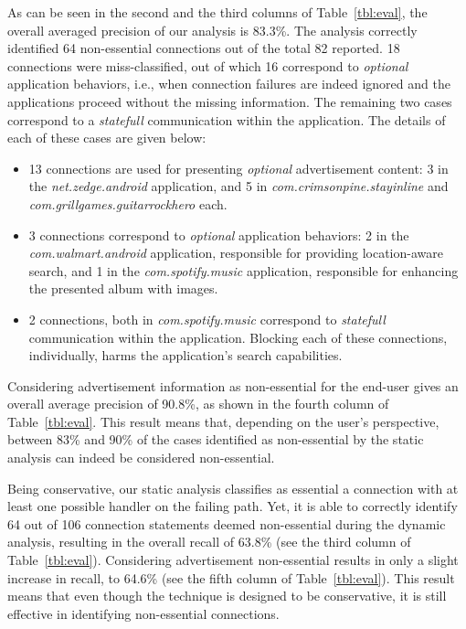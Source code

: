 As can be seen in the second and the third columns of Table~\ref{tbl:eval}, the overall averaged precision of our analysis is 83.3\%. 
The analysis correctly identified 64 non-essential connections out of the total 82 reported. 
18 connections were miss-classified, out of which 16 correspond to \emph{optional} application behaviors, i.e.,
when connection failures are indeed ignored and the applications proceed without the missing information. The 
remaining two cases correspond to a \emph{statefull} communication within the application. 
The details of each of these cases are given below: 

\begin{itemize}
\item 13 connections are used for presenting \emph{optional} advertisement content: 
3 in the \emph{net.zedge.android} application, and 
5 in \emph{com.crimsonpine.stayinline} and \emph{com.grillgames.guitarrockhero} each.
\item 3 connections correspond to 
\emph{optional} application behaviors: 2 in the \emph{com.walmart.android} application, responsible for providing location-aware search, and 1 in the \emph{com.spotify.music} application, responsible for enhancing the presented album with images.
\item 2 connections, both in \emph{com.spotify.music} correspond to \emph{statefull} communication within the application. 
Blocking each of these connections, individually, harms the application's search capabilities.
\end{itemize}

Considering advertisement information as non-essential for the end-user gives an overall average precision of 90.8\%, as shown in the fourth column of Table~\ref{tbl:eval}. This result means that, depending on the user's perspective, 
between 83\% and 90\% of the cases identified as non-essential by the static analysis can indeed be considered non-essential. 

Being conservative, our static analysis classifies as essential a connection with at least one possible handler on the failing path. Yet, it is able to correctly identify 64 out of 106 connection statements deemed non-essential during the dynamic analysis, resulting in the overall recall of 63.8\% (see the third column of Table~\ref{tbl:eval}). Considering advertisement non-essential results in only a slight increase in recall, to 64.6\% (see the fifth column of Table~\ref{tbl:eval}). This result means that even though the technique is designed to be conservative, it is still effective in identifying non-essential connections.

